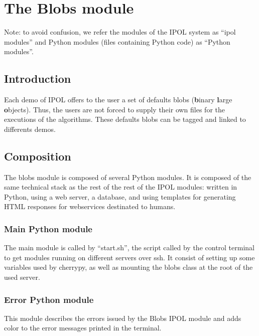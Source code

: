 \section{The Blobs module}

Note: to avoid confusion, we refer the modules of the IPOL system as ``ipol modules'' and Python modules (files containing Python code) as ``Python modules''.

\subsection{Introduction}
Each demo of IPOL offers to the user a set of defaults blobs (\textbf{b}inary \textbf{l}arge \textbf{o}bjects). Thus, the users are not forced to supply their own files for the executions of the algorithms. These defaults blobs can be tagged and linked to differents demos.

\subsection{Composition}
The blobs module is composed of several Python modules. It is composed of the same technical stack as the rest of the rest of the IPOL modules: written in Python, using a web server, a database, and using templates for generating HTML responses for webservices destinated to humans.

\subsubsection{Main Python module}
The main module is called by ``start.sh'', the script called by the control terminal to get modules running on different servers over ssh. It consist of setting up some variables used by cherrypy, as well as mounting the blobs class at the root of the used server.

\subsubsection{Error Python module}
This module describes the errors issued by the Blobs IPOL module and adds color to the error messages printed in the terminal.

